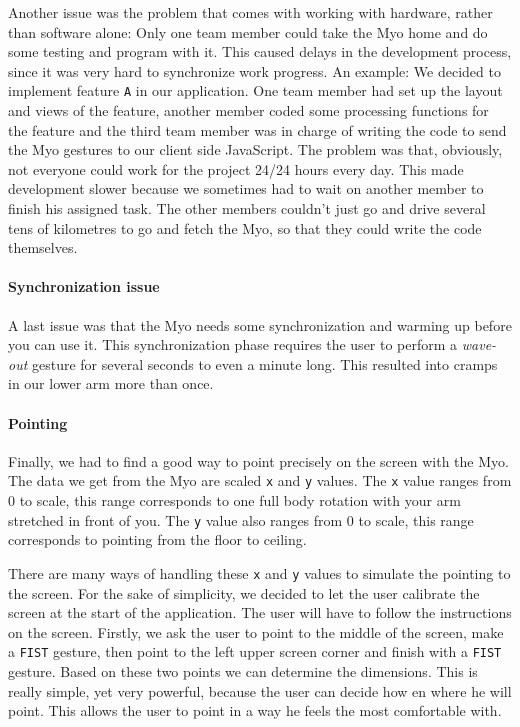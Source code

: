 \documentclass{article}
\begin{document}
Another issue was the problem that comes with working with hardware, rather than software alone: Only one team member could take the Myo home and do some testing and program with it. This caused delays in the development process, since it was very hard to synchronize work progress. An example: We decided to implement feature \texttt{A} in our application. One team member had set up the layout and views of the feature, another member coded some processing functions for the feature and the third team member was in charge of writing the code to send the Myo gestures to our client side JavaScript. The problem was that, obviously, not everyone could work for the project 24/24 hours every day. This made development slower because we sometimes had to wait on another member to finish his assigned task. The other members couldn't just go and drive several tens of kilometres to go and fetch the Myo, so that they could write the code themselves.

\paragraph{Synchronization issue}

A last issue was that the Myo needs some synchronization and warming up before you can use it. This synchronization phase requires the user to perform a \textit{wave-out} gesture for several seconds to even a minute long. This resulted into cramps in our lower arm more than once.

\paragraph{Pointing}

Finally, we had to find a good way to point precisely on the screen with the Myo. The data we get from the Myo are scaled \texttt{x} and \texttt{y} values. The \texttt{x} value ranges from 0 to scale, this range corresponds to one full body rotation with your arm stretched in front of you. The \texttt{y} value also ranges from 0 to scale, this range corresponds to pointing from the floor to ceiling. 

There are many ways of handling these \texttt{x} and \texttt{y} values to simulate the pointing to the screen. For the sake of simplicity, we decided to let the user calibrate the screen at the start of the application. The user will have to follow the instructions on the screen. Firstly, we ask the user to point to the middle of the screen, make a \texttt{FIST} gesture, then point to the left upper screen corner and finish with a \texttt{FIST} gesture. Based on these two points we can determine the dimensions. This is really simple, yet very powerful, because the user can decide how en where he will point. This allows the user to point in a way he feels the most comfortable with.
\end{document}
